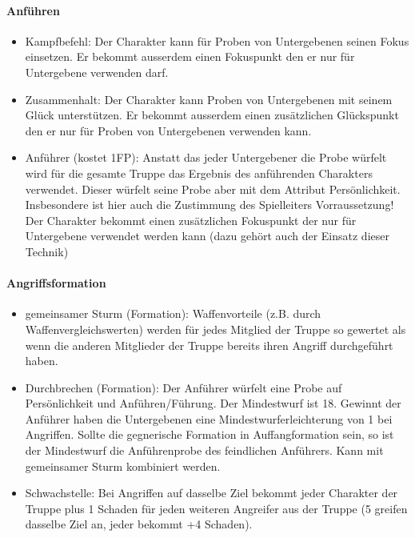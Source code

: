 \documentclass{article}
\begin{document}
\paragraph{Anführen}

\begin{itemize}
\item Kampfbefehl: Der Charakter kann für Proben von Untergebenen seinen Fokus einsetzen. Er bekommt ausserdem einen Fokuspunkt den er nur für Untergebene verwenden darf.
\item Zusammenhalt: Der Charakter kann Proben von Untergebenen mit seinem Glück unterstützen. Er bekommt ausserdem einen zusätzlichen Glückspunkt den er nur für Proben von Untergebenen verwenden kann.
\item Anführer (kostet 1FP): Anstatt das jeder Untergebener die Probe würfelt wird für die gesamte Truppe das Ergebnis des anführenden Charakters verwendet. Dieser würfelt seine Probe aber mit dem Attribut Persönlichkeit. Insbesondere ist hier auch die Zustimmung des Spielleiters Vorraussetzung! Der Charakter bekommt einen zusätzlichen Fokuspunkt der nur für Untergebene verwendet werden kann (dazu gehört auch der Einsatz dieser Technik)
\end{itemize}

\paragraph{Angriffsformation}

\begin{itemize}
\item gemeinsamer Sturm (Formation): Waffenvorteile (z.B. durch Waffenvergleichswerten) werden für jedes Mitglied der Truppe so gewertet als wenn die anderen Mitglieder der Truppe bereits ihren Angriff durchgeführt haben.
\item Durchbrechen (Formation): Der Anführer würfelt eine Probe auf Persönlichkeit und Anführen/Führung. Der Mindestwurf ist 18. Gewinnt der Anführer haben die Untergebenen eine Mindestwurferleichterung von 1 bei Angriffen. Sollte die gegnerische Formation in Auffangformation sein, so ist der Mindestwurf die Anführenprobe des feindlichen Anführers. Kann mit gemeinsamer Sturm kombiniert werden.
\item Schwachstelle: Bei Angriffen auf dasselbe Ziel bekommt jeder Charakter der Truppe plus 1 Schaden für jeden weiteren Angreifer aus der Truppe (5 greifen dasselbe Ziel an, jeder bekommt +4 Schaden).
\end{itemize}
\end{document}
